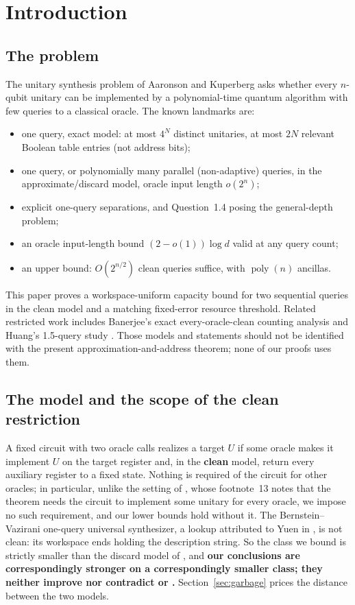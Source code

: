 \documentclass[11pt,a4paper]{article}
\theoremstyle{plain}
\theoremstyle{definition}
\theoremstyle{remark}
\DeclareMathOperator{\poly}{poly}
\begin{document}
\section{Introduction}

\subsection{The problem}

The unitary synthesis problem of Aaronson and Kuperberg \cite{AK07} asks whether every
$n$-qubit unitary can be implemented by a polynomial-time quantum algorithm with few queries
to a classical oracle. The known landmarks are:
\begin{itemize}[nosep]
\item \textbf{\cite[Thm~6.7]{AK07}} one query, exact model: at most $4^N$ distinct
unitaries, at most $2N$ relevant Boolean table entries (not address bits);
\item \textbf{\cite{LMW24}} one query, or polynomially many parallel (non-adaptive) queries,
in the approximate/discard model, oracle input length $o(2^n)$;
\item \textbf{\cite{DLM26}} explicit one-query separations, and Question~1.4 posing the
general-depth problem;
\item \textbf{\cite{BY26}} an oracle input-length bound $(2-o(1))\log d$ valid at any query
count;
\item \textbf{\cite{Ros26}} an upper bound: $O(2^{n/2})$ clean queries suffice, with
$\poly(n)$ ancillas.
\end{itemize}
This paper proves a workspace-uniform capacity bound for two sequential queries in the
clean model and a matching fixed-error resource threshold. Related restricted work
includes Banerjee's exact every-oracle-clean counting analysis \cite{Ban25} and Huang's
1.5-query study \cite{Hua25}. Those models and statements should not be identified with
the present approximation-and-address theorem; none of our proofs uses them.

\subsection{The model and the scope of the clean restriction}

A fixed circuit with two oracle calls realizes a target $U$ if some oracle makes it
implement $U$ on the target register and, in the \textbf{clean} model, return every
auxiliary register to a fixed state. Nothing is required of the circuit for other oracles;
in particular, unlike the setting of \cite[Thm~6.7]{AK07}, whose footnote~13 notes that the
theorem needs the circuit to implement some unitary for every oracle, we impose no such
requirement, and our lower bounds hold without it. The Bernstein--Vazirani one-query universal
synthesizer, a lookup attributed to Yuen in \cite{LMW24}, is not
clean: its workspace ends holding the description string. So the class we bound is strictly
smaller than the discard model of \cite{LMW24}, and \textbf{our conclusions are
correspondingly stronger on a correspondingly smaller class; they neither improve nor
contradict \cite{LMW24} or \cite{BY26}.} Section~\ref{sec:garbage} prices the distance
between the two models.
\end{document}
